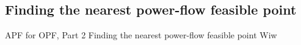 \subsection{Finding the nearest power-flow feasible point}
\begin{frame}[t]{APF for OPF, Part 2}{%
    Finding the nearest power-flow feasible point}
    Wiw
\end{frame}

